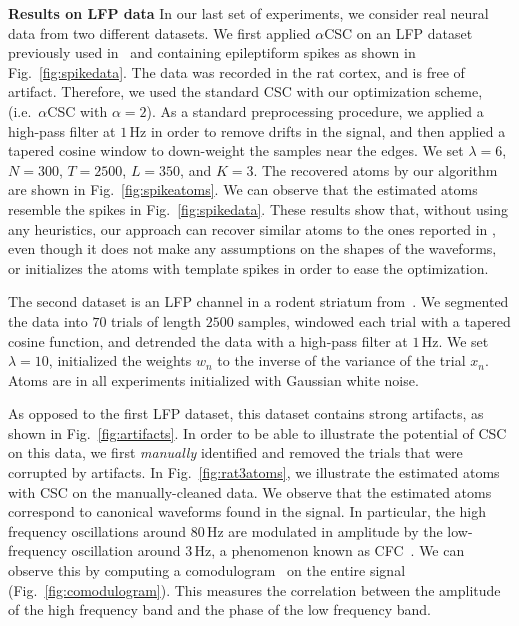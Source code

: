 \textbf{Results on LFP data}
In our last set of experiments, we consider real neural data from two different datasets. 
%
We first applied $\alpha$CSC on an LFP dataset previously used in~\cite{hitziger2017adaptive} and containing epileptiform spikes as shown in Fig.~\ref{fig:spikedata}. The data was recorded in the rat cortex, and  is free of artifact. Therefore, we used the standard CSC with our optimization scheme, (i.e.\ $\alpha$CSC with $\alpha=2$).
%
As a standard preprocessing procedure, we applied a high-pass filter at $1$\,Hz in order to remove drifts in the signal, and then applied a tapered cosine window to down-weight the samples near the edges. We set $\lambda=6$, $N=300$, $T=2500$, $L=350$, and $K=3$. The recovered atoms by our algorithm are shown in Fig.~\ref{fig:spikeatoms}. We can observe that the estimated atoms resemble the spikes in Fig.~\ref{fig:spikedata}. These results show that, without using any heuristics, our approach can recover similar atoms to the ones reported in \cite{hitziger2017adaptive}, even though it does not make any assumptions on the shapes of the waveforms, or initializes the atoms with template spikes in order to ease the optimization.





The second dataset is an LFP channel in a rodent striatum from~\cite{dallerac2017updating}. We segmented the data into $70$ trials of length $2500$ samples, windowed each trial with a tapered cosine function, and detrended the data with a high-pass filter at $1$\,Hz.
We set $\lambda=10$, initialized the weights $w_n$ to the inverse of the variance of the trial $x_n$. Atoms are in all experiments initialized with Gaussian white noise.



As opposed to the first LFP dataset, this dataset contains strong artifacts, as shown in Fig.~\ref{fig:artifacts}. In order to be able to illustrate the potential of CSC on this data, we first \emph{manually} identified and removed the trials that were corrupted by artifacts. In Fig.~\ref{fig:rat3atoms}, we illustrate the estimated atoms with CSC on the manually-cleaned data. We observe that the estimated atoms correspond to canonical waveforms found in the signal. In particular, the high frequency oscillations around $80$\,Hz are modulated in amplitude by the low-frequency oscillation around $3$\,Hz, a phenomenon known as \ac{CFC}~\citep{jensen2007cross}. We can observe this by computing a comodulogram~\citep{tort2010measuring} on the entire signal (Fig.~\ref{fig:comodulogram}). This measures the correlation between the amplitude of the high frequency band and the phase of the low frequency band. 


